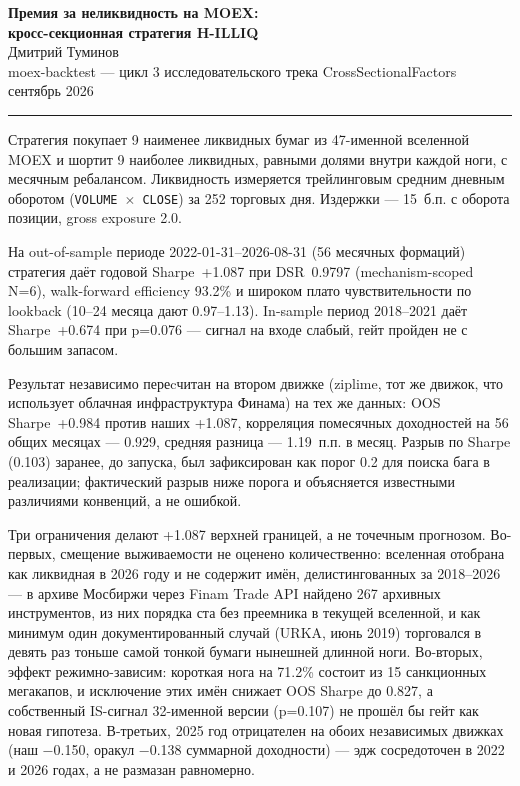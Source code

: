 \documentclass[11pt,a4paper]{article}
\title{}
\date{}
\newcommand{\repsection}[1]{\vspace{1.1em}\noindent{\headfont\Large\bfseries\color{accent}#1}\vspace{0.35em}\par}
\begin{document}
\begin{center}
{\headfont\LARGE\bfseries\color{accent} Премия за неликвидность на MOEX:\\[0.15em] кросс-секционная стратегия H-ILLIQ}\\[0.6em]
{\large Дмитрий Туминов}\\[0.15em]
{\small\color{muted} moex-backtest --- цикл 3 исследовательского трека CrossSectionalFactors \\ сентябрь 2026}
\end{center}

\vspace{0.3em}
\hrule
\vspace{0.9em}

\repsection{Резюме}

Стратегия покупает 9 наименее ликвидных бумаг из 47-именной вселенной MOEX и шортит 9 наиболее ликвидных, равными долями внутри каждой ноги, с месячным ребалансом. Ликвидность измеряется трейлинговым средним дневным оборотом (\texttt{VOLUME}~$\times$~\texttt{CLOSE}) за 252 торговых дня. Издержки --- 15~б.п. с оборота позиции, gross exposure 2.0.

На out-of-sample периоде 2022-01-31--2026-08-31 (56 месячных формаций) стратегия даёт годовой Sharpe~+1.087 при DSR~0.9797 (mechanism-scoped N=6), walk-forward efficiency 93.2\% и широком плато чувствительности по lookback (10--24 месяца дают 0.97--1.13). In-sample период 2018--2021 даёт Sharpe~+0.674 при p=0.076 --- сигнал на входе слабый, гейт пройден не с большим запасом.

Результат независимо переcчитан на втором движке (ziplime, тот же движок, что использует облачная инфраструктура Финама) на тех же данных: OOS Sharpe~+0.984 против наших +1.087, корреляция помесячных доходностей на 56 общих месяцах --- 0.929, средняя разница --- 1.19~п.п. в месяц. Разрыв по Sharpe (0.103) заранее, до запуска, был зафиксирован как порог 0.2 для поиска бага в реализации; фактический разрыв ниже порога и объясняется известными различиями конвенций, а не ошибкой.

Три ограничения делают +1.087 верхней границей, а не точечным прогнозом. Во-первых, смещение выживаемости не оценено количественно: вселенная отобрана как ликвидная в 2026 году и не содержит имён, делистингованных за 2018--2026 --- в архиве Мосбиржи через Finam Trade API найдено 267 архивных инструментов, из них порядка ста без преемника в текущей вселенной, и как минимум один документированный случай (URKA, июнь 2019) торговался в девять раз тоньше самой тонкой бумаги нынешней длинной ноги. Во-вторых, эффект режимно-зависим: короткая нога на 71.2\% состоит из 15 санкционных мегакапов, и исключение этих имён снижает OOS Sharpe до 0.827, а собственный IS-сигнал 32-именной версии (p=0.107) не прошёл бы гейт как новая гипотеза. В-третьих, 2025 год отрицателен на обоих независимых движках (наш −0.150, оракул −0.138 суммарной доходности) --- эдж сосредоточен в 2022 и 2026 годах, а не размазан равномерно.
\end{document}
